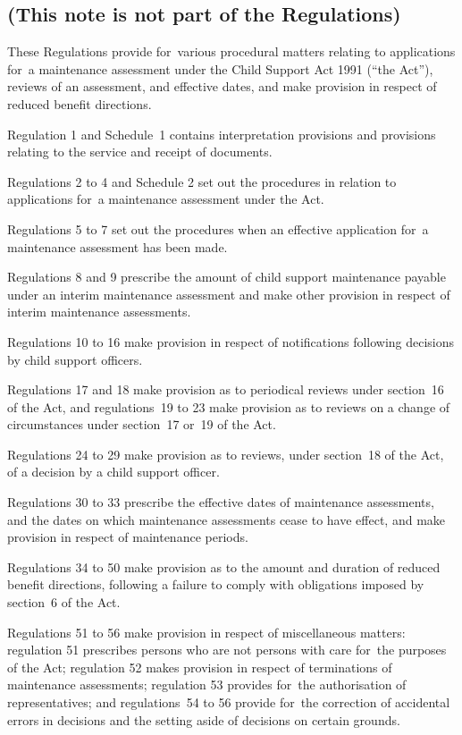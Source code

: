 \documentclass[a4paper,12pt]{article}
\begin{document}
\renewcommand\parthead{--- Explanatory Note}

\subsection*{(This note is not part of the Regulations)}

 These Regulations provide for~various procedural matters relating to applications for~a maintenance assessment under the Child Support Act 1991 (“the Act”), reviews of an assessment, and effective dates, and make provision in respect of reduced benefit directions.

  Regulation 1 and Schedule~1 contains interpretation provisions and provisions relating to the service and receipt of documents.

  Regulations 2 to 4 and Schedule 2 set out the procedures in relation to applications for~a maintenance assessment under the Act.

  Regulations 5 to 7 set out the procedures when an effective application for~a maintenance assessment has been made.

  Regulations 8 and 9 prescribe the amount of child support maintenance payable under an interim maintenance assessment and make other provision in respect of interim maintenance assessments.

  Regulations 10 to 16 make provision in respect of notifications following decisions by child support officers.

  Regulations 17 and 18 make provision as to periodical reviews under section~16 of the Act, and regulations~19 to 23 make provision as to reviews on a change of circumstances under section~17 or~19 of the Act.

  Regulations 24 to 29 make provision as to reviews, under section~18 of the Act, of a decision by a child support officer.

  Regulations 30 to 33 prescribe the effective dates of maintenance assessments, and the dates on which maintenance assessments cease to have effect, and make provision in respect of maintenance periods.

  Regulations 34 to 50 make provision as to the amount and duration of reduced benefit directions, following a failure to comply with obligations imposed by section~6 of the Act.

  Regulations 51 to 56 make provision in respect of miscellaneous matters: regulation 51 prescribes persons who are not persons with care for~the purposes of the Act; regulation 52 makes provision in respect of terminations of maintenance assessments; regulation 53 provides for~the authorisation of representatives; and regulations~54 to 56 provide for~the correction of accidental errors in decisions and the setting aside of decisions on certain grounds.
\end{document}
